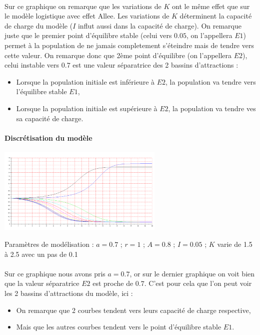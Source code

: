 \documentclass{article}
\begin{document}
\paragraph{}
Sur ce graphique on remarque que les variations de $K$ ont le même effet que sur le modèle logistique avec effet Allee. Les variations de $K$ déterminent la capacité de charge du modèle ($I$ influt aussi dans la capacité de charge). On remarque juste que le premier point d'équilibre stable (celui vers $0.05$, on l'appellera $E1$) permet à la population de ne jamais completement s'éteindre mais de tendre vers cette valeur.
On remarque donc que 2ème point d'équilibre (on l'appellera $E2$), celui instable vers $0.7$ est une valeur séparatrice des 2 bassins d'attractions :
\begin{itemize}
\item Lorsque la population initiale est inférieure à $E2$, la population va tendre vers l'équilibre stable $E1$,
\item Lorsque la population initiale est supérieure à $E2$, la population va tendre ves sa capacité de charge.
\end{itemize}

\paragraph{Discrétisation du modèle}
\begin{center}
\includegraphics[width=300px]{img/part1/TrajK.png}
\end{center}
Paramètres de modélisation : $a=0.7$ ; $r=1$ ; $A=0.8$ ; $I=0.05$ ; $K$ varie de 1.5 à 2.5 avec un pas de 0.1
\paragraph{}
Sur ce graphique nous avons pris $a=0.7$, or sur le dernier graphique on voit bien que la valeur séparatrice $E2$ est proche de $0.7$. C'est pour cela que l'on peut voir les 2 bassins d'attractions du modèle, ici :
\begin{itemize}
\item On remarque que 2 courbes tendent vers leurs capacité de charge respective,
\item Mais que les autres courbes tendent vers le point d'équilibre stable $E1$.
\end{itemize}
\end{document}
